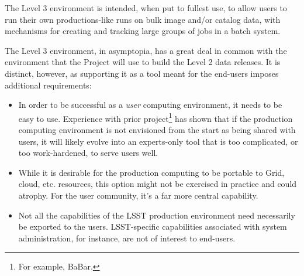 \documentclass[12pt]{article}
\begin{document}
The Level 3 environment is intended, when put to fullest use, to allow users to run their own productions-like runs on bulk image and/or catalog data, with mechanisms for creating and tracking large groups of jobs in a batch system.

The Level 3 environment, in asymptopia, has a great deal in common with the environment that the Project will use to build the Level 2 data releases. It is distinct, however, as supporting it as a tool meant for the end-users imposes additional requirements:
%
\begin{itemize}
    \item In order to be successful as a {\em user} computing environment, it needs to be easy to use. Experience with prior project\footnote{For example, BaBar.} has shown that if the production computing environment is not envisioned from the start as being shared with users, it will likely evolve into an experts-only tool that is too complicated, or too work-hardened, to serve users well. 
    \item While it is desirable for the production computing to be portable to Grid, cloud, etc. resources, this option might not be exercised in practice and could atrophy.  For the user community, it's a far more central capability.
    \item Not all the capabilities of the LSST production environment need necessarily be exported to the users. LSST-specific capabilities associated with system administration, for instance, are not of interest to end-users.
\end{itemize}
\end{document}
